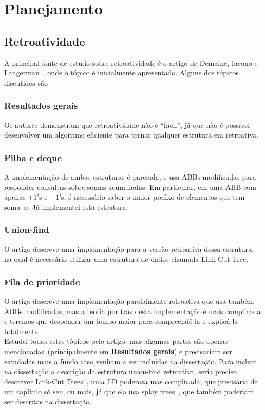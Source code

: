 \documentclass[quali.tex]{subfile}
\begin{document}
\section{Planejamento} \label{sec:planejamento}

\subsection{Retroatividade}

A principal fonte de estudo sobre retroatividade é o artigo de Demaine, Iacono e Langerman~\cite{DemaineIL2007}, onde o tópico é inicialmente apresentado. Alguns dos tópicos discutidos são

\subsubsection*{Resultados gerais}
	Os autores demonstram que retroatividade não é ``fácil'', já que não é possível desenvolver um algoritmo eficiente para tornar qualquer estrutura em retroativa.
\subsubsection*{Pilha e deque}
	A implementação de ambas estruturas é parecida, e usa ABBs modificadas para responder consultas sobre somas acumuladas. Em particular, em uma ABB com apenas $+1$'s e $-1$'s, é necessário saber o maior prefixo de elementos que tem soma~$x$. Já implementei esta estrutura.
\subsubsection*{Union-find}
	O artigo descreve uma implementação para a versão retroativa dessa estrutura, na qual é necessário utilizar uma estrutura de dados chamada Link-Cut Tree.
\subsubsection*{Fila de prioridade}
	O artigo descreve uma implementação parcialmente retroativa que usa também ABBs modificadas, mas a teoria por trás desta implementação é mais complicada e teremos que despender um tempo maior para compreendê-la e explicá-la totalmente. \\

Estudei todos estes tópicos pelo artigo, mas algumas partes são apenas mencionadas~(principalmente em \textbf{Resultados gerais}) e precisariam ser estudadas mais a fundo caso venham a ser incluídas na dissertação. Para incluir na dissertação a descrição da estrutura union-find retroativa, seria preciso descrever Link-Cut Trees~\cite{SleatorT1981}, uma ED poderosa mas complicada, que precisaria de um capítulo só seu, ou mais, já que ela usa splay trees~\cite{SleatorT1985}, que também poderiam ser descritas na dissertação.
\end{document}
